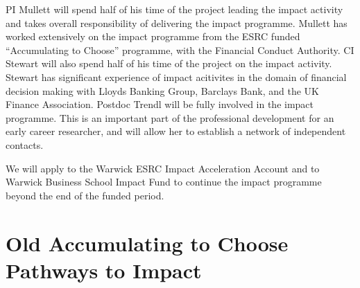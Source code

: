 \documentclass[11pt, a4paper]{article}
\begin{document}
PI Mullett will spend half of his time of the project leading the impact activity and takes overall responsibility of delivering the impact programme. Mullett has worked extensively on the impact programme from the ESRC funded ``Accumulating to Choose'' programme, with the Financial Conduct Authority. CI Stewart will also spend half of his time of the project on the impact activity. Stewart has significant experience of impact acitivites in the domain of financial decision making with Lloyds Banking Group, Barclays Bank, and the UK Finance Association. Postdoc Trendl will be fully involved in the impact programme. This is an important part of the professional development for an early career researcher, and will allow her to establish a network of independent contacts. 

We will apply to the Warwick ESRC Impact Acceleration Account and to Warwick Business School Impact Fund to continue the impact programme beyond the end of the funded period. 





\section{Old Accumulating to Choose Pathways to Impact}
\end{document}
